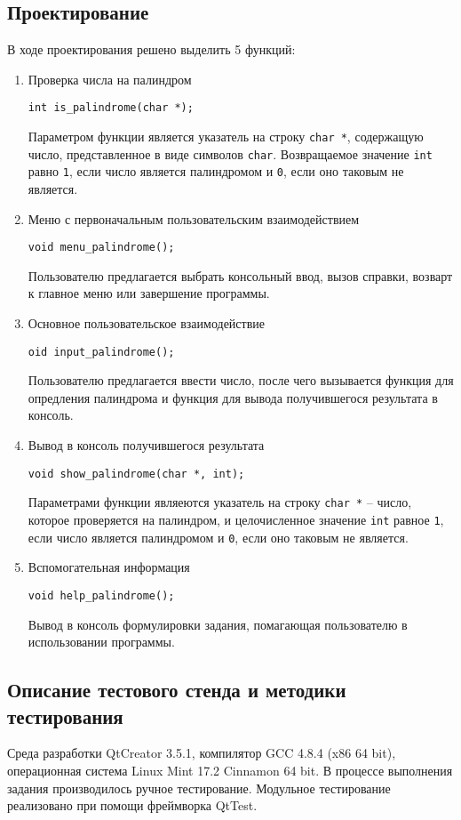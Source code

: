 \documentclass[12pt,a4paper]{report}
\begin{document}
\subsection{Проектирование}
\hspace{\parindent}В ходе проектирования решено выделить 5 функций:
\begin{enumerate}
 	\item Проверка числа на палиндром
 	
 	\verb+int is_palindrome(char *);+
 	
	Параметром функции является указатель на строку \verb+char *+, содержащую число, представленное в виде символов \verb+char+. Возвращаемое значение \verb+int+ равно \verb+1+, если число является палиндромом и \verb+0+, если оно таковым не является.	 
		 
		 
	\item Меню с первоначальным пользовательским взаимодействием
	
	\verb+void menu_palindrome();+
	
	Пользователю предлагается выбрать консольный ввод, вызов справки, возварт к главное меню или завершение программы.	
		 
		 
	\item Основное пользовательское взаимодействие
	
	\verb+oid input_palindrome();+

	Пользователю предлагается ввести число, после чего вызывается функция для опредления палиндрома и функция для вывода получившегося результата в консоль.
	
	
	\item Вывод в консоль получившегося результата
	
	\verb+void show_palindrome(char *, int);+

Параметрами функции являеются указатель на строку \verb+char *+ -- число, которое проверяется на палиндром, и целочисленное значение \verb+int+ равное \verb+1+, если число является палиндромом и \verb+0+, если оно таковым не является.	 
	
	
	\item Вспомогательная информация
	
	\verb+void help_palindrome();+
	
	Вывод в консоль формулировки задания, помагающая пользователю в использовании программы.
\end{enumerate}

\subsection{Описание тестового стенда и методики тестирования}
\hspace{\parindent}Среда разработки QtCreator 3.5.1, компилятор GCC 4.8.4 (x86 64 bit), операционная система Linux Mint 17.2 Cinnamon 64 bit.
В процессе выполнения задания производилось ручное тестирование.
Модульное тестирование реализовано при помощи фреймворка QtTest.
\end{document}
